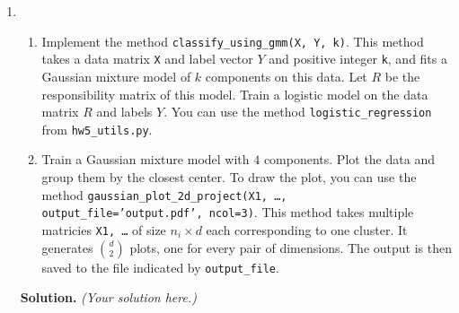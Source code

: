 \documentclass{article}
\theoremstyle{definition}
\theoremstyle{remark}
\newenvironment{Q}
{%
\clearpage
\item
}
{%
\phantom{s}
\bigskip
\textbf{Solution.}
\emph{(Your solution here.)}
}
\begin{document}
\begin{enumerate}
\begin{Q}
\begin{enumerate}
    \item
      Implement the method \texttt{classify\_using\_gmm(X, Y, k)}. This method takes a data matrix \texttt{X} and label vector $Y$ and positive integer \texttt{k}, and fits a Gaussian mixture model of $k$ components on this data. Let $R$ be the responsibility matrix of this model. Train a logistic model on the data matrix $R$ and labels $Y$. You can use the method \texttt{logistic\_regression} from \texttt{hw5\_utils.py}.

    \item
      Train a Gaussian mixture model with $4$ components. Plot the data and group them by the closest center. To draw the plot, you can use the method \texttt{gaussian\_plot\_2d\_project(X1, \ldots, output\_file='output.pdf', ncol=3)}. This method takes multiple matricies \texttt{X1, \ldots} of size $n_i \times d$ each corresponding to one cluster. It generates ${d \choose 2}$ plots, one for every pair of dimensions. The output is then saved to the file indicated by \texttt{output\_file}.
  \end{enumerate}
\end{Q}
\end{enumerate}



\end{document}
